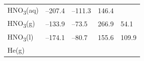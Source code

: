 \documentclass[
  9pt,
]{extbook}
\theoremstyle{definition}
\theoremstyle{definition}
\theoremstyle{definition}
\theoremstyle{remark}
\begin{document}
\begin{longtable}[]{@{}lllll@{}}
\begin{minipage}[t]{0.10\columnwidth}\raggedright
HNO\textsubscript{3}(aq)\strut
\end{minipage} & \begin{minipage}[t]{0.19\columnwidth}\raggedright
--207.4\strut
\end{minipage} & \begin{minipage}[t]{0.20\columnwidth}\raggedright
--111.3\strut
\end{minipage} & \begin{minipage}[t]{0.18\columnwidth}\raggedright
146.4\strut
\end{minipage} & \begin{minipage}[t]{0.18\columnwidth}\raggedright
\strut
\end{minipage}\tabularnewline
\begin{minipage}[t]{0.10\columnwidth}\raggedright
HNO\textsubscript{3}(g)\strut
\end{minipage} & \begin{minipage}[t]{0.19\columnwidth}\raggedright
--133.9\strut
\end{minipage} & \begin{minipage}[t]{0.20\columnwidth}\raggedright
--73.5\strut
\end{minipage} & \begin{minipage}[t]{0.18\columnwidth}\raggedright
266.9\strut
\end{minipage} & \begin{minipage}[t]{0.18\columnwidth}\raggedright
54.1\strut
\end{minipage}\tabularnewline
\begin{minipage}[t]{0.10\columnwidth}\raggedright
HNO\textsubscript{3}(l)\strut
\end{minipage} & \begin{minipage}[t]{0.19\columnwidth}\raggedright
--174.1\strut
\end{minipage} & \begin{minipage}[t]{0.20\columnwidth}\raggedright
--80.7\strut
\end{minipage} & \begin{minipage}[t]{0.18\columnwidth}\raggedright
155.6\strut
\end{minipage} & \begin{minipage}[t]{0.18\columnwidth}\raggedright
109.9\strut
\end{minipage}\tabularnewline
\begin{minipage}[t]{0.10\columnwidth}\raggedright
He(g)\strut
\end{minipage} & \begin{minipage}[t]{0.19\columnwidth}\raggedright

\end{minipage}
\end{longtable}
\end{document}
